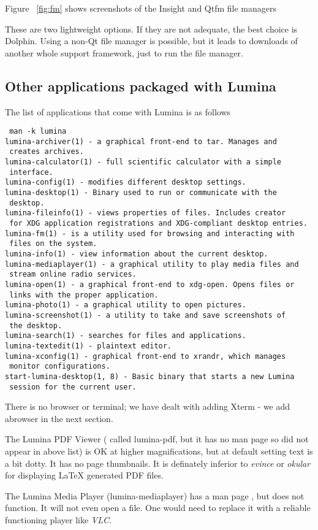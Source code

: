 \documentclass{article}  %
\begin{document}
{Figure ~\ref{fig:fm} shows screenshots of the Insight and Qtfm file managers

These are two lightweight options. If they are not adequate, the best choice is Dolphin.  Using a non-Qt file manager is possible, but it leads to downloads of another whole support framework, just to run the file manager.

\subsection{Other applications packaged with Lumina}
The list of applications that come with Lumina is as follows
\begin{verbatim}
 man -k lumina
lumina-archiver(1) - a graphical front-end to tar. Manages and
 creates archives.
lumina-calculator(1) - full scientific calculator with a simple
 interface.
lumina-config(1) - modifies different desktop settings.
lumina-desktop(1) - Binary used to run or communicate with the
 desktop.
lumina-fileinfo(1) - views properties of files. Includes creator
 for XDG application registrations and XDG-compliant desktop entries.
lumina-fm(1) - is a utility used for browsing and interacting with
 files on the system.
lumina-info(1) - view information about the current desktop.
lumina-mediaplayer(1) - a graphical utility to play media files and
 stream online radio services.
lumina-open(1) - a graphical front-end to xdg-open. Opens files or
 links with the proper application.
lumina-photo(1) - a graphical utility to open pictures.
lumina-screenshot(1) - a utility to take and save screenshots of
 the desktop.
lumina-search(1) - searches for files and applications.
lumina-textedit(1) - plaintext editor.
lumina-xconfig(1) - graphical front-end to xrandr, which manages
 monitor configurations.
start-lumina-desktop(1, 8) - Basic binary that starts a new Lumina
 session for the current user.
\end{verbatim}
There is no browser or terminal; we have dealt with adding Xterm - we add abrowser in the next section.
 
The Lumina PDF Viewer ( called lumina-pdf, but it has no man page so did not appear in above list) is OK at higher magnifications, but at default setting text is a bit dotty. It has no page thumbnails. It is definately inferior to {\em evince} or {\em okular} for displaying \LaTeX \hspace{.1cm} generated PDF files. 

The Lumina Media Player (lumina-mediaplayer) has a man page , but does not function. It will not even open a file. One would need to replace it with a reliable functioning player like {\em VLC}.


}
\end{document}
